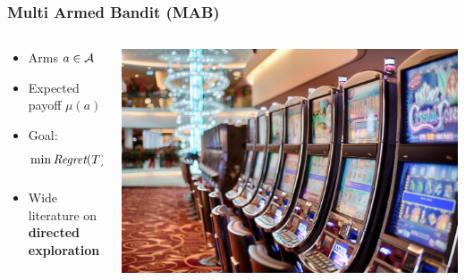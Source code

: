 \documentclass[aspectratio=169, table]{beamer}
\newcommand{\enb}[1]{\textcolor{poliblue1}{\textbf{#1}}}
\begin{document}
\begin{frame}
	\frametitle{Multi Armed Bandit (MAB)}
	\begin{columns}
		\begin{column}{.65\textwidth}
			\begin{overlayarea}{\textwidth}{\textheight}
			\vspace{.5cm}
			\begin{itemize}
				\setlength{\itemsep}{20pt}
				\item<1-> Arms $a \in \mathcal{A}$
				\item<2-> Expected payoff $\mu(a)$
				\item<3-> Goal: $\min \textit{Regret}(T) = \sum\limits_{t=1}^T[\mu(a^*) - \mu(a_t)]$
				\item<4-> Wide literature on \enb{directed exploration}~\citep{bubeck2012regret,lattimore2019bandit}	
		\end{itemize}
		\end{overlayarea}
		\end{column}
		\begin{column}{.35\textwidth}
			\begin{overlayarea}{\textwidth}{\textheight}
			\vspace{.2\textheight}
			\includegraphics[width=\textwidth]{slot.jpg}
			\end{overlayarea}
	\end{column}
	\end{columns}
\end{frame}
\end{document}
